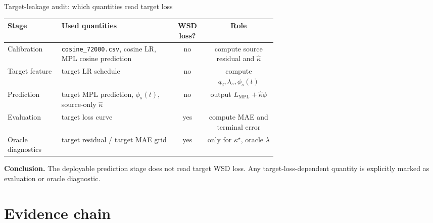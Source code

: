 \documentclass[9pt,aspectratio=169]{beamer}
\newcommand{\code}[1]{\texttt{\small #1}}
\begin{document}
\begin{frame}{Target-leakage audit: which quantities read target loss}
\scriptsize
\begin{center}
\end{center}
\vspace{0.4em}
\tiny
\begin{center}
\begin{tabular}{L{0.20\linewidth}L{0.42\linewidth}cc}
\toprule
Stage & Used quantities & WSD loss? & Role\\
\midrule
Calibration &
\code{cosine\_72000.csv}, cosine LR, MPL cosine prediction &
no & compute source residual and \(\widehat\kappa\)\\
\addlinespace
Target feature &
target LR schedule &
no & compute \(q_2,\lambda_s,\phi_s(t)\)\\
\addlinespace
Prediction &
target MPL prediction, \(\phi_s(t)\), source-only \(\widehat\kappa\) &
no & output \(L_{\mathrm{MPL}}+\widehat\kappa\phi\)\\
\addlinespace
Evaluation &
target loss curve &
yes & compute MAE and terminal error\\
\addlinespace
Oracle diagnostics &
target residual / target MAE grid &
yes & only for \(\kappa^\star\), oracle \(\lambda\)\\
\bottomrule
\end{tabular}
\end{center}
\vfill
\small
\textbf{Conclusion.}
The deployable prediction stage does not read target WSD loss.
Any target-loss-dependent quantity is explicitly marked as evaluation or oracle diagnostic.
\end{frame}

\section{Evidence chain}
\end{document}
